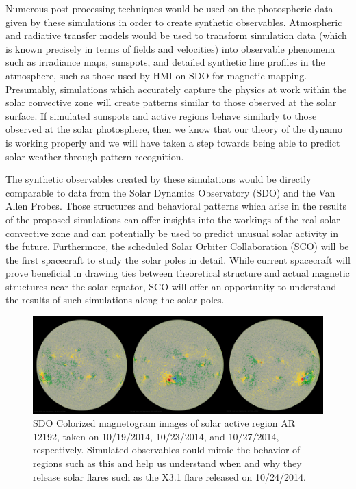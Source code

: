 \documentclass[aasms,12pt]{article}
\begin{document}
Numerous post-processing techniques would be used on the photospheric data 
given by these simulations in order to create synthetic observables.
Atmospheric and radiative transfer models would be used to transform simulation
data (which is known precisely in terms of fields and velocities) into
observable phenomena such as irradiance maps, sunspots, and detailed synthetic
line profiles in the atmosphere, such as those used by HMI on SDO for magnetic
mapping.  Presumably, simulations
which accurately capture the physics at work within the solar convective zone
will create patterns similar to those observed at the solar surface.  If
simulated sunspots and active regions behave similarly to those observed at the
solar photosphere, then we know that our
theory of the dynamo is working properly and we will have taken a step towards
being able to predict solar weather through pattern recognition.

The synthetic observables created by these simulations would be directly
comparable to data from the Solar Dynamics Observatory (SDO) and the Van Allen
Probes.  Those structures and behavioral patterns which arise in the results
of the proposed simulations can offer insights into the workings of the real
solar convective zone and can potentially be used to predict unusual solar
activity in the future.  Furthermore, the scheduled Solar Orbiter Collaboration
(SCO) will be the first spacecraft to study the solar poles in detail.  While
current spacecraft will prove beneficial in drawing ties between theoretical
structure and actual magnetic structures near the solar equator, SCO will offer
an opportunity to understand the results of such simulations along the solar
poles. 

\begin{figure}[t!]
\centering
\includegraphics[width=14cm]{figs/2014_oct_sunspots.jpg}
\caption{SDO Colorized magnetogram images of solar active region AR 12192, taken
	on 10/19/2014, 10/23/2014, and 10/27/2014, respectively.  Simulated
	observables could mimic the behavior of regions such as this and help
	us understand when and why they release solar flares such as the X3.1
	flare released on 10/24/2014.
	\label{AR12192}}
\end{figure}
\end{document}
